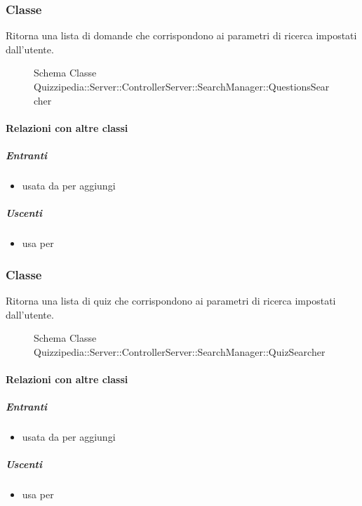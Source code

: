 \subsubsection{Classe }
Ritorna una lista di domande che corrispondono ai parametri di ricerca impostati dall'utente.
\begin{figure}[H]
\centering
\noindent{}
\caption[Schema Classe QuestionsSearcher]{Schema Classe Quizzipedia::Server::ControllerServer::SearchManager::QuestionsSearcher}
\end{figure}
\paragraph{Relazioni con altre classi}
\subparagraph{Entranti}
\begin{itemize}
\item usata da  per aggiungi
\end{itemize}
\subparagraph{Uscenti}
\begin{itemize}
\item usa  per 
\end{itemize}
\subsubsection{Classe }
Ritorna una lista di quiz che corrispondono ai parametri di ricerca impostati dall'utente.
\begin{figure}[H]
\centering
\noindent{}
\caption[Schema Classe QuizSearcher]{Schema Classe Quizzipedia::Server::ControllerServer::SearchManager::QuizSearcher}
\end{figure}
\paragraph{Relazioni con altre classi}
\subparagraph{Entranti}
\begin{itemize}
\item usata da  per aggiungi
\end{itemize}
\subparagraph{Uscenti}
\begin{itemize}
\item usa  per 
\end{itemize}
